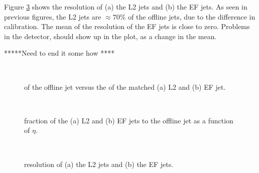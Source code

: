 Figure \ref{SW_jet_L2EF_Reco} shows the \et{} resolution of (a) the L2 jets and (b) the EF jets. 
As seen in previous figures, the L2 jets are $\approx 70 \%$ of the offline jets, due to the difference in calibration.
The mean of the \et{} resolution of the EF jets is close to zero. 
Problems in the detector, should show up in the plot, as a change in the mean.

*****Need to end it some how ****


\begin{figure}
\centering
\mbox{
              \quad
              \quad
                              }
\caption[Offline jet \et{} versus L2/EF jet \et{}]{
\et{} of the offline jet versus the \et{} of the matched (a) L2 and (b) EF jet.
\label{SW_jet_L2EF_EtEt}}
\end{figure}


\begin{figure}
\centering
\mbox{
              \quad
              \quad
                              }
\caption[\et{} fraction of L2 and EF jet to offline jet ]{
\et{} fraction of the (a) L2 and (b) EF jets to the offline jet \et{} as a function of $\eta$. 
\label{SW_jet_L2EF_EtFrac_Eta}}

\end{figure}

\begin{figure}
\centering
\mbox{
              \quad
              \quad
                              }
\caption[\et{} resolution between offline jet \et{} and L2/EF jet \et{}]{
\et{} resolution of (a) the L2 jets and (b) the EF jets. 
\label{SW_jet_L2EF_Reco}}
\end{figure}

